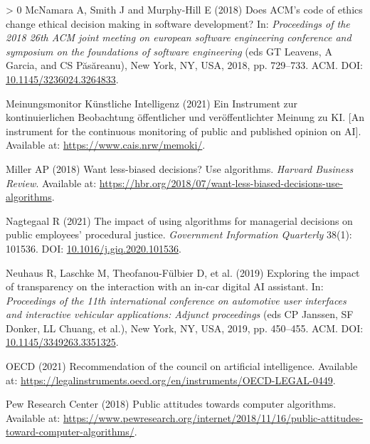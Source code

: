 \documentclass{article}
\newlength{\cslhangindent}
\newenvironment{CSLReferences}[3] %
 {%
  \setlength{\parindent}{0pt}
  \ifodd #1 \everypar{\setlength{\hangindent}{\cslhangindent}}\ignorespaces\fi
  \ifnum #2 > 0
  \setlength{\parskip}{#2\baselineskip}
  \fi
 }%
 {}
\begin{document}
\begin{CSLReferences}{1}{0}
\leavevmode\hypertarget{ref-McNamara.2018}{}%
McNamara A, Smith J and Murphy-Hill E (2018) Does ACM's code of ethics
change ethical decision making in software development? In:
\emph{Proceedings of the 2018 26th ACM joint meeting on european
software engineering conference and symposium on the foundations of
software engineering} (eds GT Leavens, A Garcia, and CS Păsăreanu), New
York, NY, USA, 2018, pp. 729--733. ACM. DOI:
\href{https://doi.org/10.1145/3236024.3264833}{10.1145/3236024.3264833}.

\leavevmode\hypertarget{ref-MeinungsmonitorKunstlicheIntelligenz.2021}{}%
Meinungsmonitor Künstliche Intelligenz (2021) Ein Instrument zur
kontinuierlichen Beobachtung {ö}ffentlicher und ver{ö}ffentlichter
Meinung zu KI. [An instrument for the continuous monitoring of public and published opinion on AI]. Available at: \url{https://www.cais.nrw/memoki/}.

\leavevmode\hypertarget{ref-Miller.2018}{}%
Miller AP (2018) Want less-biased decisions? Use algorithms.
\emph{Harvard Business Review}. Available at:
\url{https://hbr.org/2018/07/want-less-biased-decisions-use-algorithms}.

\leavevmode\hypertarget{ref-Nagtegaal.2021}{}%
Nagtegaal R (2021) The impact of using algorithms for managerial
decisions on public employees' procedural justice. \emph{Government
Information Quarterly} 38(1): 101536. DOI:
\href{https://doi.org/10.1016/j.giq.2020.101536}{10.1016/j.giq.2020.101536}.

\leavevmode\hypertarget{ref-Neuhaus.2019}{}%
Neuhaus R, Laschke M, Theofanou-Fülbier D, et al. (2019) Exploring the
impact of transparency on the interaction with an in-car digital AI
assistant. In: \emph{Proceedings of the 11th international conference on
automotive user interfaces and interactive vehicular applications:
Adjunct proceedings} (eds CP Janssen, SF Donker, LL Chuang, et al.), New
York, NY, USA, 2019, pp. 450--455. ACM. DOI:
\href{https://doi.org/10.1145/3349263.3351325}{10.1145/3349263.3351325}.

\leavevmode\hypertarget{ref-OECD.2021}{}%
OECD (2021) Recommendation of the council on artificial intelligence.
Available at:
\url{https://legalinstruments.oecd.org/en/instruments/OECD-LEGAL-0449}.

\leavevmode\hypertarget{ref-PewResearchCenter.2018}{}%
Pew Research Center (2018) Public attitudes towards computer algorithms.
Available at:
\url{https://www.pewresearch.org/internet/2018/11/16/public-attitudes-toward-computer-algorithms/}.


\end{CSLReferences}
\end{document}
